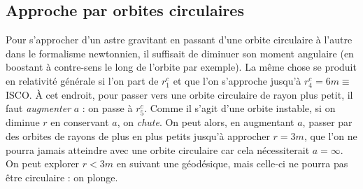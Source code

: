 \subsection{Approche par orbites circulaires}
Pour s'approcher d'un astre gravitant en passant d'une orbite circulaire à l'autre dans le formalisme newtonnien, il suffisait de diminuer son moment angulaire (en boostant à contre-sens le long de l'orbite par exemple). La même chose se produit en relativité générale si l'on part de $r^c_1$ et que l'on s'approche jusqu'à $r^c_4 = 6m \equiv$ ISCO. À cet endroit, pour passer vers une orbite circulaire de rayon plus petit, il faut \emph{augmenter} $a$ : on passe à $r^c_5$. Comme il s'agit d'une orbite instable, si on diminue $r$ en conservant $a$, on \emph{chute}. On peut alors, en augmentant $a$, passer par des orbites de rayons de plus en plus petits jusqu'à approcher $r=3m$, que l'on ne pourra jamais atteindre avec une orbite circulaire car cela nécessiterait $a = \infty$. On peut explorer $r<3m$ en suivant une géodésique, mais celle-ci ne pourra pas être circulaire : on plonge.
